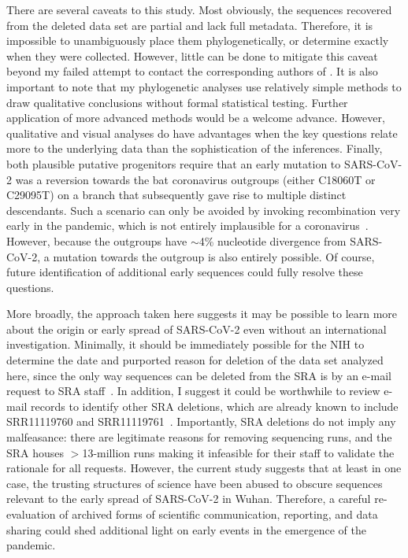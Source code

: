 \documentclass[9pt,twocolumn,twoside]{gsajnl_modified}
\begin{document}
There are several caveats to this study.
Most obviously, the sequences recovered from the deleted data set are partial and lack full metadata.
Therefore, it is impossible to unambiguously place them phylogenetically, or determine exactly when they were collected.
However, little can be done to mitigate this caveat beyond my failed attempt to contact the corresponding authors of \citet{wang2020medRxiv}.
It is also important to note that my phylogenetic analyses use relatively simple methods to draw qualitative conclusions without formal statistical testing.
Further application of more advanced methods would be a welcome advance.
However, qualitative and visual analyses do have advantages when the key questions relate more to the underlying data than the sophistication of the inferences.
Finally, both plausible putative progenitors require that an early mutation to SARS-CoV-2 was a reversion towards the bat coronavirus outgroups (either C18060T or C29095T) on a branch that subsequently gave rise to multiple distinct descendants.
Such a scenario can only be avoided by invoking recombination very early in the pandemic, which is not entirely implausible for a coronavirus~\citep{boni2020evolutionary}.
However, because the outgroups have $\sim$4\% nucleotide divergence from SARS-CoV-2, a mutation towards the outgroup is also entirely possible.
Of course, future identification of additional early sequences could fully resolve these questions.

More broadly, the approach taken here suggests it may be possible to learn more about the origin or early spread of SARS-CoV-2 even without an international investigation.
Minimally, it should be immediately possible for the NIH to determine the date and purported reason for deletion of the data set analyzed here, since the only way sequences can be deleted from the SRA is by an e-mail request to SRA staff~\citep{SRA_deletion}.
In addition, I suggest it could be worthwhile to review e-mail records to identify other SRA deletions, which are already known to include SRR11119760 and SRR11119761~\citep{USRTK2020}.
Importantly, SRA deletions do not imply any malfeasance: there are legitimate reasons for removing sequencing runs, and the SRA houses $>$13-million runs making it infeasible for their staff to validate the rationale for all requests.
However, the current study suggests that at least in one case, the trusting structures of science have been abused to obscure sequences relevant to the early spread of SARS-CoV-2 in Wuhan.
Therefore, a careful re-evaluation of archived forms of scientific communication, reporting, and data sharing could shed additional light on early events in the emergence of the pandemic.
\end{document}
